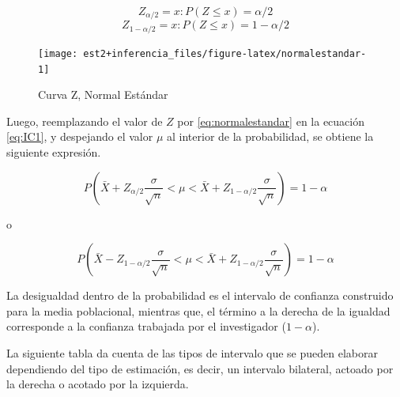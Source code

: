 \documentclass[
  11pt,
]{book}
\theoremstyle{definition}
\theoremstyle{definition}
\theoremstyle{definition}
\theoremstyle{definition}
\theoremstyle{remark}
\begin{document}
\[Z_{\alpha/2} = x : P(Z \leq x) = \alpha/2\]
\[Z_{1-\alpha/2} = x : P(Z \leq x) = 1-\alpha/2\]

\begin{figure}

{\centering \texttt{[image: est2+inferencia\_files/figure-latex/normalestandar-1]} 

}

\caption{Curva Z, Normal Estándar}\label{fig:normalestandar}
\end{figure}

Luego, reemplazando el valor de \(Z\) por \eqref{eq:normalestandar} en la ecuación \eqref{eq:IC1}, y despejando el valor \(\mu\) al interior de la probabilidad, se obtiene la siguiente expresión.

\begin{equation}
P\left( \bar{X} + Z_{\alpha/2}\frac{\sigma}{\sqrt{n}} < \mu < \bar{X} + Z_{1-\alpha/2}\frac{\sigma}{\sqrt{n}}\right) = 1-\alpha
\label{eq:IntC}
\end{equation}

o

\begin{equation}
P\left( \bar{X} - Z_{1-\alpha/2}\frac{\sigma}{\sqrt{n}} < \mu < \bar{X} + Z_{1-\alpha/2}\frac{\sigma}{\sqrt{n}}\right) = 1-\alpha
\label{eq:IntC2}
\end{equation}

La desigualdad dentro de la probabilidad es el intervalo de confianza construido para la media poblacional, mientras que, el término a la derecha de la igualdad corresponde a la confianza trabajada por el investigador (\(1-\alpha\)).

La siguiente tabla da cuenta de las tipos de intervalo que se pueden elaborar dependiendo del tipo de estimación, es decir, un intervalo bilateral, actoado por la derecha o acotado por la izquierda.

\begin{table}[H]
\centering
\caption{\label{tab:unnamed-chunk-8}Intervalos de confianza para la media de una distribución normal y varianza poblacional conocida}
\centering
{}
\end{table}
\end{document}
